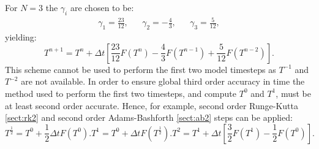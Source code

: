 \documentclass[a4paper]{book}
\begin{document}
For $N = 3$ the $\gamma_i$ are chosen to be:
\begin{align}
  \gamma_1 = \frac{23}{12}, & & \gamma_2 = -\frac{4}{3}, & & \gamma_3 = \frac{5}{12},
\end{align}
yielding:
\begin{equation}
  T^{n + 1} = T^n + \Delta t \left[ \frac{23}{12} F(T^n) - \frac{4}{3} F(T^{n - 1}) + \frac{5}{12} F(T^{n - 2}) \right].
\end{equation}
This scheme cannot be used to perform the first two model timesteps as $T^{-1}$
and $T^{-2}$ are not available. In order to ensure global third order accuracy
in time the method used to perform the first two timesteps, and compute $T^0$
and $T^1$, must be at least second order accurate. Hence, for example, second
order Runge-Kutta \ref{sect:rk2} and second order Adams-Bashforth \ref{sect:ab2}
steps can be applied:
\begin{subequations}
  \begin{equation}
    T^{\frac{1}{2}} = T^0 + \frac{1}{2} \Delta t F(T^0).
  \end{equation}
  \begin{equation}
    T^1 = T^0 + \Delta t F(T^{\frac{1}{2}}).
  \end{equation}
  \begin{equation}
    T^2 = T^1 + \Delta t \left[ \frac{3}{2} F(T^1) - \frac{1}{2} F(T^0) \right].
  \end{equation}
\end{subequations}
\end{document}
